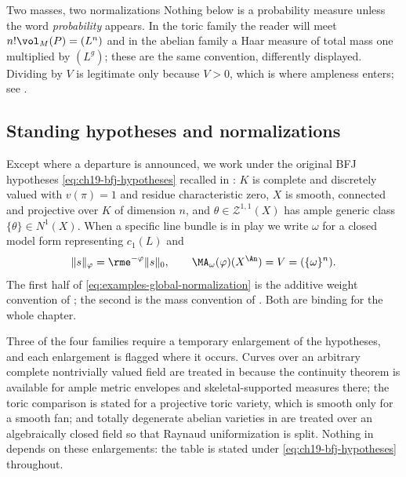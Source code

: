\begin{warning}{Two masses, two normalizations}
Nothing below is a probability measure unless the word \emph{probability}
appears.  In the toric family the reader will meet
\(n!\vol_M(P)=(L^n)\) and in the abelian family a Haar measure of total mass
one multiplied by \((L^g)\); these are the same convention, differently
displayed.  Dividing by \(V\) is legitimate only because \(V>0\), which is
where ampleness enters; see .
\end{warning}

\subsection{Standing hypotheses and normalizations}
\label{sec:ch31-hypotheses}

Except where a departure is announced, we work under the original BFJ
hypotheses \eqref{eq:ch19-bfj-hypotheses} recalled in
: \(K\) is complete and discretely valued with
\(v(\pi)=1\) and residue characteristic zero, \(X\) is smooth, connected and
projective over \(K\) of dimension \(n\), and
\(\theta\in\mathcal Z^{1,1}(X)\) has ample generic class
\(\{\theta\}\in N^1(X)\).  When a specific line bundle is in play we write
\(\omega\) for a closed model form representing \(c_1(L)\) and
\begin{equation}
              \|s\|_\varphi=\rme^{-\varphi}\|s\|_0,
              \qquad \MA_\omega(\varphi)(X^{\An})
                       =V=(\{\omega\}^n).
\label{eq:examples-global-normalization}
\end{equation}
The first half of \eqref{eq:examples-global-normalization} is the additive
weight convention of ; the second is the mass
convention of .  Both are binding for the whole
chapter.

Three of the four families require a temporary enlargement of the
hypotheses, and each enlargement is flagged where it occurs.  Curves over an
arbitrary complete nontrivially valued field are treated in
 because the continuity theorem
 is available for ample
metric envelopes and skeletal-supported measures there; the toric
comparison  is stated for a projective toric
variety, which is smooth only for a smooth fan; and totally degenerate
abelian varieties in  are treated over an
algebraically closed field so that Raynaud uniformization is split.  Nothing
in  depends on these enlargements: the table is stated
under \eqref{eq:ch19-bfj-hypotheses} throughout.

